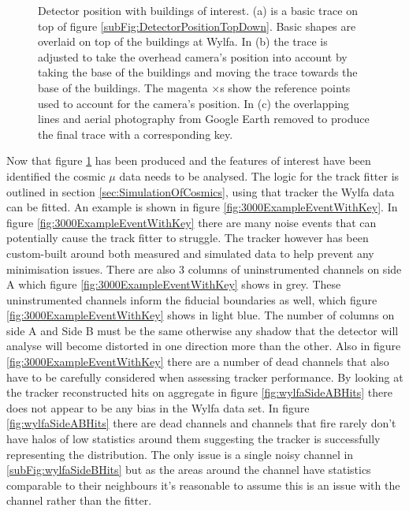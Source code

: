 \begin{figure}[!h]
\begin{subfigure}{1.0\textwidth}
  \captionsetup{width=.9\linewidth}
  \caption{}
  \label{subFig:wylfaTraceStep4}
\end{subfigure}
\caption{Detector position with buildings of interest. (a) is a basic trace on top of figure \ref{subFig:DetectorPositionTopDown}. Basic shapes are overlaid on top of the buildings at Wylfa. In (b) the trace is adjusted to take the overhead camera's position into account by taking the base of the buildings and moving the trace towards the base of the buildings. The magenta $\times$s show the reference points used to account for the camera's position. In (c) the overlapping lines and aerial photography from Google Earth removed to produce the final trace with a corresponding key.}
\label{fig:wylfaTraceSteps1-4}
\end{figure}


Now that figure \ref{subFig:wylfaTraceStep4} has been produced and the features of interest have been identified the cosmic $\mu$ data needs to be analysed. The logic for the track fitter is outlined in section \ref{sec:SimulationOfCosmics}, using that tracker the Wylfa data can be fitted. An example is shown in figure \ref{fig:3000ExampleEventWithKey}. In figure \ref{fig:3000ExampleEventWithKey} there are many noise events that can potentially cause the track fitter to struggle. The tracker however has been custom-built around both measured and simulated data to help prevent any minimisation issues. There are also 3 columns of uninstrumented channels on side A which figure \ref{fig:3000ExampleEventWithKey} shows in grey. These uninstrumented channels inform the fiducial boundaries as well, which figure \ref{fig:3000ExampleEventWithKey} shows in light blue. The number of columns on side A and Side B must be the same otherwise any shadow that the detector will analyse will become distorted in one direction more than the other. Also in figure \ref{fig:3000ExampleEventWithKey} there are a number of dead channels that also have to be carefully considered when assessing tracker performance. By looking at the tracker reconstructed hits on aggregate in figure \ref{fig:wylfaSideABHits} there does not appear to be any bias in the Wylfa data set. In figure \ref{fig:wylfaSideABHits} there are dead channels and channels that fire rarely don't have halos of low statistics around them suggesting the tracker is successfully representing the distribution. The only issue is a single noisy channel in \ref{subFig:wylfaSideBHits} but as the areas around the channel have statistics comparable to their neighbours it's reasonable to assume this is an issue with the channel rather than the fitter. 

